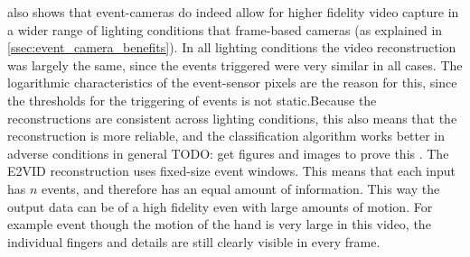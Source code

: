  also shows that event-cameras do indeed allow for higher fidelity video capture in a wider range of lighting conditions that frame-based cameras (as explained in \cref{ssec:event_camera_benefits}). In all lighting conditions the video reconstruction was largely the same, since the events triggered were very similar in all cases. The logarithmic characteristics of the event-sensor pixels are the reason for this, since the thresholds for the triggering of events is not static.Because the reconstructions are consistent across lighting conditions, this also means that the reconstruction is more reliable, and the classification algorithm works better in adverse conditions in general \color{red} TODO: get figures and images to prove this \color{black}. The E2VID reconstruction uses fixed-size event windows. This means that each input has $ n $ events, and therefore has an equal amount of information. This way the output data can be of a high fidelity even with large amounts of motion. For example event though the motion of the hand is very large in this video, the individual fingers and details are still clearly visible in every frame.

